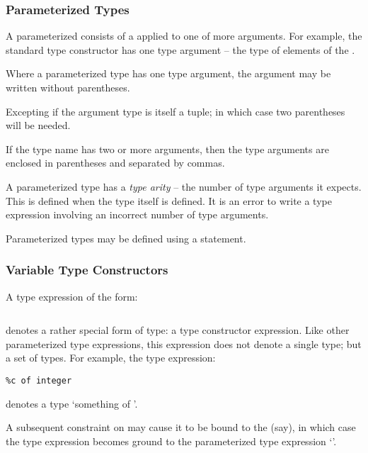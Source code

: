 \subsubsection{Parameterized Types}
\label{parameterizedType}

A parameterized  consists of a  applied to one of more  arguments. For example, the standard  type constructor has one type argument -- the type of elements of the .

Where a parameterized type has one type argument, the argument may be written without parentheses.
\begin{aside}
Excepting if the argument type is itself a tuple; in which case two parentheses will be needed.
\end{aside}
If the type name has two or more arguments, then the type arguments are enclosed in parentheses and separated by commas.

A parameterized type has a \emph{type arity} -- the number of type arguments it expects. This is defined when the type itself is defined. It is an error to write a type expression involving an incorrect number of type arguments.

Parameterized types may be defined using a  statement.

\subsubsection{Variable Type Constructors}
\label{variableConstructor}

A type expression of the form:
\begin{lstlisting}[mathescape=true]
%c of (%t$\sub1\sequence{,}$%t$\subn$)
\end{lstlisting}
denotes a rather special form of type: a type constructor expression. Like other parameterized type expressions, this expression does not denote a single type; but a set of types. For example, the type expression:
\begin{lstlisting}
%c of integer
\end{lstlisting}
denotes a type `something of '.

A subsequent constraint on  may cause it to be bound to the   (say), in which case the type expression becomes ground to the parameterized type expression `'.

